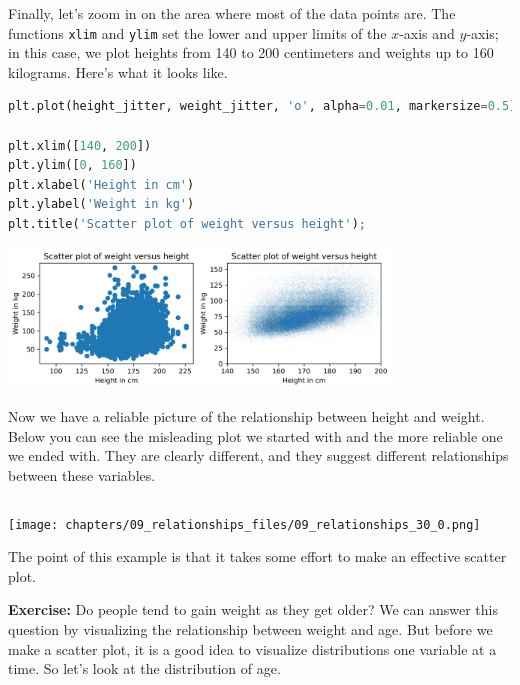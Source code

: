 Finally, let's zoom in on the area where most of the data points are.
The functions \passthrough{\lstinline!xlim!} and
\passthrough{\lstinline!ylim!} set the lower and upper limits of the
\(x\)-axis and \(y\)-axis; in this case, we plot heights from 140 to 200
centimeters and weights up to 160 kilograms. Here's what it looks like.

\begin{lstlisting}[language=Python,style=source]
plt.plot(height_jitter, weight_jitter, 'o', alpha=0.01, markersize=0.5)

plt.xlim([140, 200])
plt.ylim([0, 160])
plt.xlabel('Height in cm')
plt.ylabel('Weight in kg')
plt.title('Scatter plot of weight versus height');
\end{lstlisting}

\begin{center}
\includegraphics[width=4in]{chapters/09_relationships_files/09_relationships_28_0.png}
\end{center}

Now we have a reliable picture of the relationship between height and
weight. Below you can see the misleading plot we started with and the
more reliable one we ended with. They are clearly different, and they
suggest different relationships between these variables.

\begin{lstlisting}[language=Python,style=source]
\end{lstlisting}

\begin{center}
\texttt{[image: chapters/09\_relationships\_files/09\_relationships\_30\_0.png]}
\end{center}

The point of this example is that it takes some effort to make an
effective scatter plot.

\textbf{Exercise:} Do people tend to gain weight as they get older? We
can answer this question by visualizing the relationship between weight
and age. But before we make a scatter plot, it is a good idea to
visualize distributions one variable at a time. So let's look at the
distribution of age.

